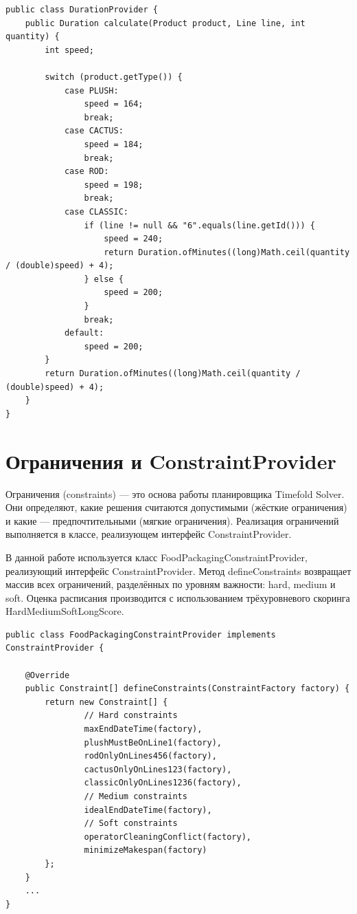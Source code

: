 \vspace{3cm}
\begin{lstlisting}[caption={класс DurationProvider}, label={lst:classDurationProvider}]
public class DurationProvider {
    public Duration calculate(Product product, Line line, int quantity) {
        int speed;

        switch (product.getType()) {
            case PLUSH:
                speed = 164;
                break;
            case CACTUS:
                speed = 184;
                break;
            case ROD:
                speed = 198;
                break;
            case CLASSIC:
                if (line != null && "6".equals(line.getId())) {
                    speed = 240;
                    return Duration.ofMinutes((long)Math.ceil(quantity / (double)speed) + 4);
                } else {
                    speed = 200;
                }
                break;
            default:
                speed = 200;
        }
        return Duration.ofMinutes((long)Math.ceil(quantity / (double)speed) + 4);
    }
}
\end{lstlisting}

\section{Ограничения и ConstraintProvider}

Ограничения (constraints) — это основа работы планировщика Timefold Solver. Они определяют, какие решения считаются допустимыми (жёсткие ограничения) и какие — предпочтительными (мягкие ограничения). Реализация ограничений выполняется в классе, реализующем интерфейс ConstraintProvider.

В данной работе используется класс FoodPackagingConstraintProvider, реализующий интерфейс ConstraintProvider. Метод defineConstraints возвращает массив всех ограничений, разделённых по уровням важности: hard, medium и soft. Оценка расписания производится с использованием трёхуровневого скоринга HardMediumSoftLongScore.

\vspace{5cm}

\begin{lstlisting}[caption={класс FoodPackagingConstraintProvider}, label={lst:classConstraintProvider}]
public class FoodPackagingConstraintProvider implements ConstraintProvider {

    @Override
    public Constraint[] defineConstraints(ConstraintFactory factory) {
        return new Constraint[] {
                // Hard constraints
                maxEndDateTime(factory),
                plushMustBeOnLine1(factory),
                rodOnlyOnLines456(factory),
                cactusOnlyOnLines123(factory),
                classicOnlyOnLines1236(factory),
                // Medium constraints
                idealEndDateTime(factory),
                // Soft constraints
                operatorCleaningConflict(factory),
                minimizeMakespan(factory)
        };
    }
    ...
}
\end{lstlisting}

